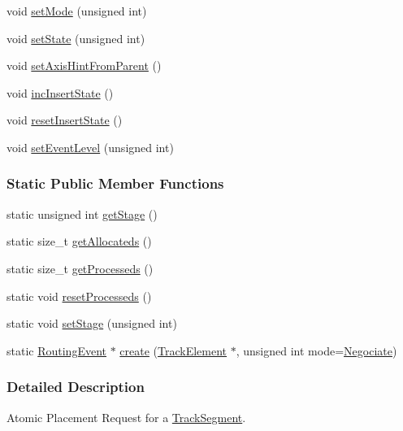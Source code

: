 \begin{DoxyCompactItemize}
\item 
void \hyperlink{classKite_1_1RoutingEvent_a85982827650655ef9d6e1206874ead69}{set\+Mode} (unsigned int)
\item 
void \hyperlink{classKite_1_1RoutingEvent_af7ce7f73feb28f3df8f3180632a2f731}{set\+State} (unsigned int)
\item 
void \hyperlink{classKite_1_1RoutingEvent_a02a3f1f2801d4ebbbe676e062878faae}{set\+Axis\+Hint\+From\+Parent} ()
\item 
void \hyperlink{classKite_1_1RoutingEvent_a86c4b1b3d406c12667188ad44ce366db}{inc\+Insert\+State} ()
\item 
void \hyperlink{classKite_1_1RoutingEvent_ae35f271a106f6c6a6039e4a6f8bf4009}{reset\+Insert\+State} ()
\item 
void \hyperlink{classKite_1_1RoutingEvent_a70a9ecd62b806eff001aa602132cc630}{set\+Event\+Level} (unsigned int)
\end{DoxyCompactItemize}
\subsubsection*{Static Public Member Functions}
\begin{DoxyCompactItemize}
\item 
static unsigned int \hyperlink{classKite_1_1RoutingEvent_a110307ff26b264ea83f69aa1bab23626}{get\+Stage} ()
\item 
static size\+\_\+t \hyperlink{classKite_1_1RoutingEvent_a91c8bc1a6bdb1b15c3c084ebfd38af47}{get\+Allocateds} ()
\item 
static size\+\_\+t \hyperlink{classKite_1_1RoutingEvent_a0a3993330692b7eb816e9c776d161ad1}{get\+Processeds} ()
\item 
static void \hyperlink{classKite_1_1RoutingEvent_a6cf10bb4e4488948e4c616c55a8e6514}{reset\+Processeds} ()
\item 
static void \hyperlink{classKite_1_1RoutingEvent_a7300c33d439e453796b170eeaf4bf04d}{set\+Stage} (unsigned int)
\item 
static \hyperlink{classKite_1_1RoutingEvent}{Routing\+Event} $\ast$ \hyperlink{classKite_1_1RoutingEvent_a131ef83c7a57a64aed4f698c0433dffa}{create} (\hyperlink{classKite_1_1TrackElement}{Track\+Element} $\ast$, unsigned int mode=\hyperlink{classKite_1_1RoutingEvent_a46c8a310cf4c094f8c80e1cb8dc1f911a3980b02882c46c9bd4caf15040b85d1a}{Negociate})
\end{DoxyCompactItemize}


\subsubsection{Detailed Description}
Atomic Placement Request for a \hyperlink{classKite_1_1TrackSegment}{Track\+Segment}. 

